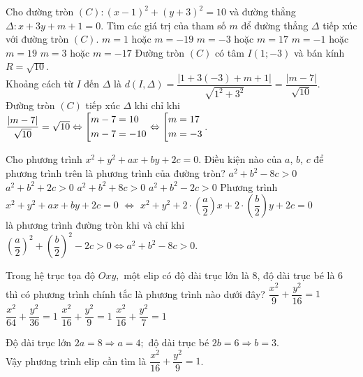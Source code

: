 \begin{ex}%
	Cho đường tròn $(C):(x-1)^2+(y+3)^2=10$ và đường thẳng $\Delta:x+3y+m+1=0$. Tìm các giá trị của tham số $ m $ để đường thẳng $\Delta$ tiếp xúc với đường tròn $(C)$.
	\choice
	{$m=1$ hoặc $m=-19$}
	{\True $m=-3$ hoặc $m=17$}
	{$m=-1$ hoặc $m=19$}
	{$m=3$ hoặc $m=-17$}
	\loigiai
	{
		Đường tròn $(C)$ có tâm $I(1;-3)$ và bán kính $R=\sqrt{10}$.\\
		Khoảng cách từ $I$ đến $\Delta$ là $d\left( I,\Delta\right)=\dfrac{\left|1+3(-3)+m+1 \right| }{\sqrt{1^2+3^2}}=\dfrac{\left| m-7\right| }{\sqrt{10}} $.\\
		Đường tròn $(C)$ tiếp xúc $\Delta$ khi chỉ khi $\dfrac{\left| m-7 \right| }{\sqrt{10}}=\sqrt{10}\Leftrightarrow \left[\begin{aligned}&m-7=10\\&m-7=-10\\\end{aligned}\right.\Leftrightarrow\left[\begin{aligned}&m=17\\&m=-3\end{aligned}\right.$.
	}
\end{ex}
\begin{ex}%
Cho phương trình $ x^2 + y^2 + ax + by + 2c = 0. $	 Điều kiện nào của $ a$, $ b $, $c $ để phương trình trên là phương trình của đường tròn?
	\choice
	{\True $ a^2 + b^2 - 8c > 0 $}
	{$ a^2 + b^2 + 2c > 0   $}
	{$ a^2 + b^2 + 8c > 0 $}
	{$ a^2 + b^2 - 2c > 0 $}
\loigiai
{Phương trình $ x^2 + y^2 + ax + by + 2c = 0$ $\Leftrightarrow $ $x^2 + y^2 + 2\cdot \left(\dfrac{a}{2}\right)x + 2\cdot \left(\dfrac{b}{2}\right)y + 2c = 0  $\\
		là phương trình đường tròn khi và chỉ khi $ \left(\dfrac{a}{2}\right)^2 + \left(\dfrac{b}{2}\right)^2 - 2c > 0 \Leftrightarrow a^2 + b^2 - 8c > 0$.
}
\end{ex}
\begin{ex}%
Trong hệ trục tọa độ $ Oxy, $	một elip có độ dài trục lớn là $ 8 $, độ dài trục bé là $ 6 $ thì có phương trình chính tắc là phương trình nào dưới đây?
	\choice
	{$ \dfrac{x^2}{9} + \dfrac{y^2}{16} = 1 $}
	{$ \dfrac{x^2}{64} + \dfrac{y^2}{36} = 1 $}
	{\True $ \dfrac{x^2}{16} + \dfrac{y^2}{9} = 1 $ }
	{$ \dfrac{x^2}{16} + \dfrac{y^2}{7} = 1 $}
	\loigiai
	{Độ dài trục lớn $ 2a = 8 \Rightarrow a = 4; $
		độ dài trục bé $ 2b = 6 \Rightarrow b = 3 $.\\
		Vậy phương trình elip cần tìm là $ \dfrac{x^2}{16} + \dfrac{y^2}{9} = 1 $.
		
	}
\end{ex}
